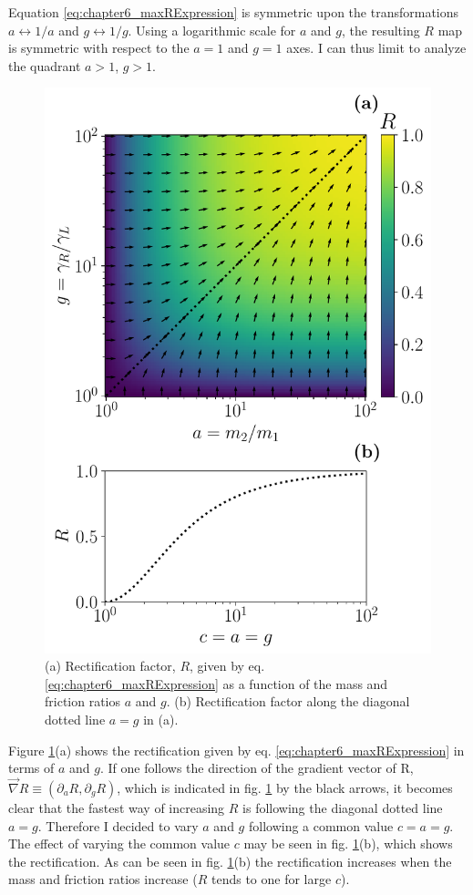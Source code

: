 Equation \eqref{eq:chapter6_maxRExpression} is symmetric upon the transformations $a \leftrightarrow 1/a$ and $g \leftrightarrow 1/g$. Using a logarithmic scale for $a$ and $g$, the resulting $R$ map is symmetric with respect to the $a=1$ and $g=1$ axes. I can thus limit to analyze the quadrant $a > 1$, $g > 1$.


\begin{figure}
  \center
  \includegraphics[width=0.75\linewidth]{Figures/MaximalR.pdf}
  \caption{(a) Rectification factor, $R$, given by eq. \eqref{eq:chapter6_maxRExpression} as a function of the mass and friction ratios $a$ and $g$. (b) Rectification factor along the diagonal dotted line $a=g$ in (a).}
  \label{fig:maximalR}
\end{figure}

Figure \ref{fig:maximalR}(a) shows the rectification given by eq. \eqref{eq:chapter6_maxRExpression} in terms of $a$ and $g$. If one follows the direction of the gradient vector of R, $\overrightarrow{\nabla}R\equiv\left( \partial_a R, \partial_g R \right)$, which is indicated in fig. \ref{fig:maximalR} by the black arrows, it becomes clear that the fastest way of increasing $R$ is following the diagonal dotted line $a=g$. Therefore I decided to vary $a$ and $g$ following a common value $c=a = g$. The effect of varying  the common value $c$ may be seen in fig. \ref{fig:maximalR}(b), which  shows the rectification. As can be seen in fig. \ref{fig:maximalR}(b) the rectification increases when the mass and friction ratios increase ($R$ tends to one for large $c$).
%
%
